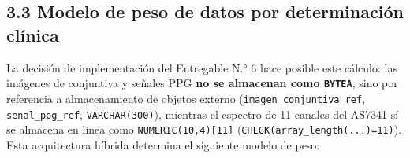 \documentclass[11pt,a4paper]{article}
\begin{document}
\subsection{3.3 Modelo de peso de datos por determinación clínica}\label{modelo-de-peso-de-datos-por-determinaciuxf3n-cluxednica}

La decisión de implementación del Entregable N.° 6 hace posible este cálculo: las imágenes de conjuntiva y señales PPG \textbf{no se almacenan como \texttt{BYTEA}}, sino por referencia a almacenamiento de objetos externo (\texttt{imagen\_conjuntiva\_ref}, \texttt{senal\_ppg\_ref}, \texttt{VARCHAR(300)}), mientras el espectro de 11 canales del AS7341 sí se almacena en línea como \texttt{NUMERIC(10,4){[}11{]}} (\texttt{CHECK(array\_length(...)=11)}). Esta arquitectura híbrida determina el siguiente modelo de peso:
\end{document}
